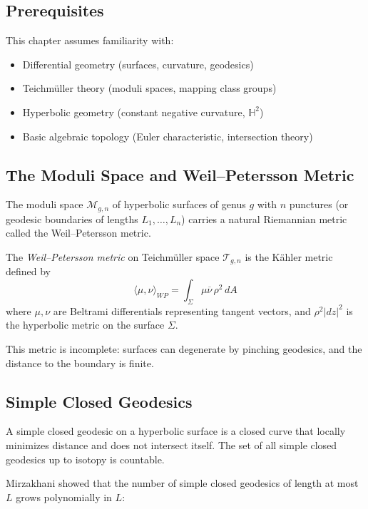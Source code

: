 \subsection{Prerequisites}
This chapter assumes familiarity with:
\begin{itemize}
\item Differential geometry (surfaces, curvature, geodesics)
\item Teichm\"uller theory (moduli spaces, mapping class groups)
\item Hyperbolic geometry (constant negative curvature, $\mathbb{H}^2$)
\item Basic algebraic topology (Euler characteristic, intersection theory)
\end{itemize}

\subsection{The Moduli Space and Weil--Petersson Metric}

The moduli space $\mathcal{M}_{g,n}$ of hyperbolic surfaces of genus $g$ with $n$ punctures (or geodesic boundaries of lengths $L_1, \ldots, L_n$) carries a natural Riemannian metric called the Weil--Petersson metric.

\begin{definition}
The \emph{Weil--Petersson metric} on Teichm\"uller space $\mathcal{T}_{g,n}$ is the K\"ahler metric defined by
\[\langle \mu, \nu \rangle_{WP} = \int_{\Sigma} \mu \overline{\nu} \, \rho^2 \, dA\]
where $\mu, \nu$ are Beltrami differentials representing tangent vectors, and $\rho^2|dz|^2$ is the hyperbolic metric on the surface $\Sigma$.
\end{definition}

This metric is incomplete: surfaces can degenerate by pinching geodesics, and the distance to the boundary is finite.

\subsection{Simple Closed Geodesics}

A simple closed geodesic on a hyperbolic surface is a closed curve that locally minimizes distance and does not intersect itself. The set of all simple closed geodesics up to isotopy is countable.

Mirzakhani showed that the number of simple closed geodesics of length at most $L$ grows polynomially in $L$:

